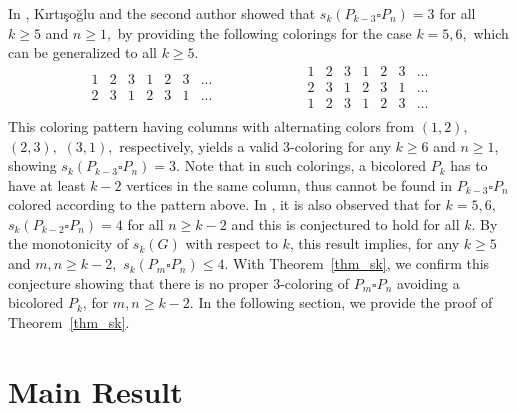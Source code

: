 \documentclass[
final, nomarks
]{dmtcs-episciences}
\begin{document}
In \cite{kirticsouglu2024coloring}, K\i rt\i \c{s}o\u{g}lu and the second author showed that 
$s_k(P_{k-3}\square P_n)=3$ 
for all $k\geq 5$ and $n\geq 1,$ by 
providing the following colorings for the case $k=5,6,$ 
which can be generalized to all $k\geq 5.$
\small
\begin{equation*}\label{eq:sk_G3m}
\begin{matrix}
1& 2 & 3& 1& 2 & 3&...\\
2 & 3 & 1& 2 & 3 & 1&...\\
\end{matrix}\qquad \qquad \qquad
\begin{matrix}
1 & 2 & 3 & 1 & 2 & 3 & \dots\\
2 & 3 & 1 & 2 & 3 & 1 & \dots\\
1 & 2 & 3 & 1 & 2 & 3 & \dots\\
\end{matrix}
\end{equation*} 
\normalsize
This coloring pattern having  
columns with alternating colors from $(1,2),$ $(2,3),$ $(3,1),$ respectively, yields a valid 3-coloring for any $k\geq 6$ and $n\geq 1$, showing $s_k(P_{k-3}\square P_n)= 3$. 
Note that in such colorings, a bicolored $P_k$ has to have at least $k-2$ vertices in the same column, thus cannot be found in $P_{k-3}\square P_n$ colored according to the pattern above. 
In \cite{kirticsouglu2024coloring}, it is also observed that for $k=5,6$, $s_k(P_{k-2}\square P_n)=4$ for all $n \geq k-2$ and this is conjectured to hold 
for all $k.$ By the monotonicity of $s_k(G)$ with respect to $k$, this result implies, for any $k\geq 5$ and $m, n\geq k-2,$ $s_k(P_m\square P_n)\leq 4$. With Theorem~\ref{thm_sk}, we confirm this conjecture showing that there is no proper 3-coloring of $P_m\square P_n$ avoiding a bicolored $P_k$, for $m,n\geq k-2$. In the following section, we provide the proof of Theorem~\ref{thm_sk}. 




 \section{Main Result}
\end{document}
